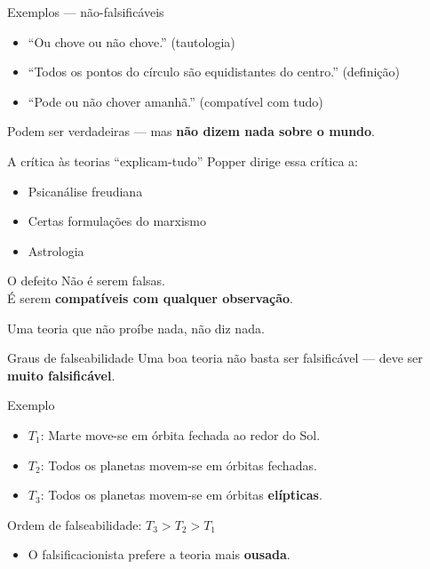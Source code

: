 \documentclass[aspectratio=169]{beamer}
\newcommand{\impt}[1]{\textcolor{maccent}{\textbf{#1}}}
\newcommand{\ntc}[1]{\textcolor{mprimary}{#1}}
\begin{document}
\begin{frame}{Exemplos --- não-falsificáveis}
\begin{itemize}
  \item ``Ou chove ou não chove.'' \hfill (tautologia)
  \pause
  \item ``Todos os pontos do círculo são equidistantes do centro.'' \hfill (definição)
  \pause
  \item ``Pode ou não chover amanhã.'' \hfill (compatível com tudo)
\end{itemize}
\vspace{0.5cm}
\pause
\begin{alertblock}{}
Podem ser verdadeiras --- mas \impt{não dizem nada sobre o mundo}.
\end{alertblock}
\end{frame}

\begin{frame}{A crítica às teorias ``explicam-tudo''}
Popper dirige essa crítica a:
\vspace{0.3cm}
\begin{itemize}
  \item Psicanálise freudiana
  \item Certas formulações do marxismo
  \item Astrologia
\end{itemize}
\pause
\vspace{0.5cm}
\begin{alertblock}{O defeito}
Não é serem falsas. \\
É serem \impt{compatíveis com qualquer observação}.
\end{alertblock}
\pause
\vspace{0.3cm}
\ntc{Uma teoria que não proíbe nada, não diz nada.}
\end{frame}

\begin{frame}{Graus de falseabilidade}
Uma boa teoria não basta ser falsificável --- deve ser \impt{muito falsificável}.
\vspace{0.4cm}
\pause
\begin{block}{Exemplo}
\begin{itemize}
  \item $T_1$: Marte move-se em órbita fechada ao redor do Sol.
  \item $T_2$: Todos os planetas movem-se em órbitas fechadas.
  \item $T_3$: Todos os planetas movem-se em órbitas \impt{elípticas}.
\end{itemize}
\end{block}
\pause
\vspace{0.3cm}
\ntc{Ordem de falseabilidade:} \quad $T_3 > T_2 > T_1$
\pause
\vspace{0.3cm}
\begin{itemize}
  \item[$\rightarrow$] O falsificacionista prefere a teoria mais \impt{ousada}.
\end{itemize}
\end{frame}
\end{document}
